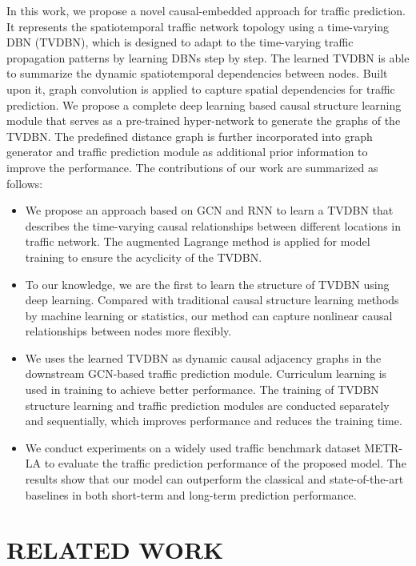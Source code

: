 \documentclass[letterpaper, 10 pt, conference]{ieeeconf}
\begin{document}
In this work, we propose a novel causal-embedded approach for traffic prediction. It represents the spatiotemporal traffic network topology using a time-varying DBN (TVDBN), which is designed to adapt to the time-varying traffic propagation patterns by learning DBNs step by step. The learned TVDBN is able to summarize the dynamic spatiotemporal dependencies between nodes. Built upon it, graph convolution is applied to capture spatial dependencies for traffic prediction. We propose a complete deep learning based causal structure learning module that serves as a pre-trained hyper-network to generate the graphs of the TVDBN. The predefined distance graph is further incorporated into graph generator and traffic prediction module as additional prior information to improve the performance. The contributions of our work are summarized as follows:
\begin{itemize}
\item We propose an approach based on GCN and RNN to learn a TVDBN that describes the time-varying causal relationships between different locations in traffic network. The augmented Lagrange method is applied for model training to ensure the acyclicity of the TVDBN. 
        \item To our knowledge, we are the first to learn the structure of TVDBN using deep learning. Compared with traditional causal structure learning methods by machine learning or statistics, our method can capture nonlinear causal relationships between nodes more flexibly. 
\item We uses the learned TVDBN as dynamic causal adjacency graphs in the downstream GCN-based traffic prediction module. Curriculum learning is used in training to achieve better performance. The training of TVDBN structure learning and traffic prediction modules are conducted separately and sequentially, which improves performance and reduces the training time. 
        \item We conduct experiments on a widely used traffic benchmark dataset METR-LA to evaluate the traffic prediction performance of the proposed model. The results show that our model can outperform the classical and state-of-the-art baselines in both short-term and long-term prediction performance.
\end{itemize}



\section{RELATED WORK}
\end{document}
